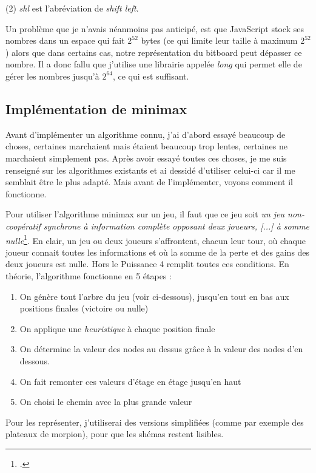 \documentclass[a4paper]{article}
\begin{document}
    (2) \textit{shl} est l'abréviation de \textit{shift left}.

	
	Un problème que je n'avais néanmoins pas anticipé, est que JavaScript stock ses nombres dans un espace qui fait $2^{52}$ bytes (ce qui limite leur taille à maximum $2^{52}$) alors que dans certains cas, notre représentation du bitboard peut dépasser ce nombre. Il a donc fallu que j'utilise une librairie appelée \textit{long} qui permet elle de gérer les nombres jusqu'à $2^{64}$, ce qui est suffisant.

\subsection{Implémentation de minimax}

    Avant d'implémenter un algorithme connu, j'ai d'abord essayé beaucoup de choses, certaines marchaient mais étaient beaucoup trop lentes, certaines ne marchaient simplement pas. Après avoir essayé toutes ces choses, je me suis renseigné sur les algorithmes existants et ai dessidé d'utiliser celui-ci car il me semblait être le plus adapté. Mais avant de l'implémenter, voyons comment il fonctionne.
    
    Pour utiliser l'algorithme minimax sur un jeu, il faut que ce jeu soit \textit{un jeu non-coopératif synchrone à information complète opposant deux joueurs, [...] à somme nulle}\footcite{wiki_minimax_neuman}. En clair, un jeu ou deux joueurs s'affrontent, chacun leur tour, où chaque joueur connait toutes les informations et où la somme de la perte et des gains des deux joueurs est nulle. Hors le Puissance 4 remplit toutes ces conditions. En théorie, l'algorithme fonctionne en 5 étapes : 
    \begin{enumerate}
        \item On génère tout l'arbre du jeu (voir ci-dessous), jusqu'en tout en bas aux positions finales (victoire ou nulle)
        \item On applique une \textit{heuristique} à chaque position finale
        \item On détermine la valeur des nodes au dessus grâce à la valeur des nodes d'en dessous.
        \item On fait remonter ces valeurs d'étage en étage jusqu'en haut
        \item On choisi le chemin avec la plus grande valeur
    \end{enumerate}
    Pour les représenter, j'utiliserai des versions simplifiées (comme par exemple des plateaux de morpion), pour que les shémas restent lisibles.
\end{document}

